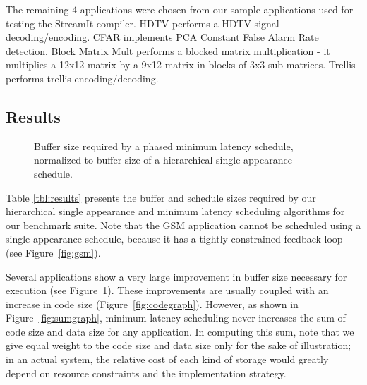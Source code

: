 The remaining 4 applications were chosen from our sample applications
used for testing the StreamIt compiler. HDTV performs a HDTV signal
decoding/encoding. CFAR implements PCA Constant False Alarm Rate
detection. Block Matrix Mult performs a blocked matrix multiplication
- it multiplies a 12x12 matrix by a 9x12 matrix in blocks of 3x3
sub-matrices. Trellis performs trellis encoding/decoding.

\begin{comment}

\subsection{Methodology}
\label{sec:results:methodology}

The following data has been collected: number of nodes, number of
node executions per steady state, schedule size and buffer size
for pseudo single appearance and minimal latency schedules.

\subsubsection{Schedule Compression}

\end{comment}

\subsection{Results}
\label{sec:results:results}

\begin{figure}[t]
\vspace{6pt}
\caption{\small Buffer size required by a phased minimum latency schedule,
normalized to buffer size of a hierarchical single appearance
schedule.\protect\label{fig:buffergraph}}
\vspace{-6pt}
\end{figure}

Table \ref{tbl:results} presents the buffer and schedule sizes
required by our hierarchical single appearance and minimum latency
scheduling algorithms for our benchmark suite.  Note that the GSM
application cannot be scheduled using a single appearance schedule,
because it has a tightly constrained feedback loop (see
Figure~\ref{fig:gsm}).

Several applications show a very large improvement in buffer size
necessary for execution (see Figure~\ref{fig:buffergraph}).  These
improvements are usually coupled with an increase in code size
(Figure~\ref{fig:codegraph}).  However, as shown in
Figure~\ref{fig:sumgraph}, minimum latency scheduling never increases
the sum of code size and data size for any application.  In computing
this sum, note that we give equal weight to the code size and data
size only for the sake of illustration; in an actual system, the
relative cost of each kind of storage would greatly depend on resource
constraints and the implementation strategy.

